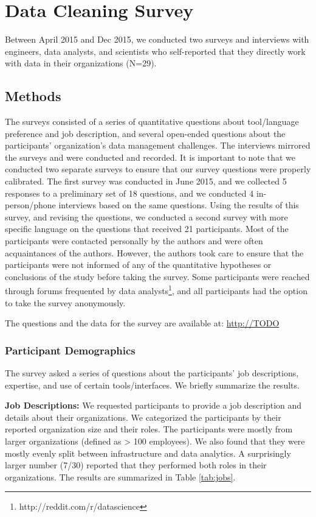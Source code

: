 \section{Data Cleaning Survey}
Between April 2015 and Dec 2015, we conducted two surveys and interviews with engineers, data analysts, and scientists who self-reported that they directly work with data in their organizations (N=29).

\subsection{Methods}
The surveys consisted of a series of quantitative questions about tool/language preference and job description, and several open-ended questions about the participants' organization's data management challenges. The interviews mirrored the surveys and were conducted and recorded. It is important to note that we conducted two separate surveys to ensure that our survey questions were properly calibrated. The first survey was conducted in June 2015, and we collected 5 responses to a preliminary set of 18 questions, and we conducted 4 in-person/phone interviews based on the same questions. Using the results of this survey, and revising the questions, we conducted a second survey with more specific language on the questions that received 21 participants. 
Most of the participants were contacted personally by the authors and were often acquaintances of the authors. However, the authors took care to ensure that the participants were not informed of any of the quantitative hypotheses or conclusions of the study before taking the survey. 
Some participants were reached through forums frequented by data analysts\footnote{http://reddit.com/r/datascience}, and all participants had the option to take the survey anonymously.

The questions and the data for the survey are available at: \url{http://TODO}

\subsubsection{Participant Demographics}
The survey asked a series of questions about the participants' job descriptions, expertise, and use of certain tools/interfaces.
We briefly summarize the results.

\vspace{0.5em}

\noindent\textbf{Job Descriptions: } We requested participants to provide a job description and details about their organizations. We categorized the participants by their reported organization size and their roles. The participants were mostly from larger organizations (defined as > 100 employees). We also found that they were mostly evenly split between infrastructure and data analytics. A surprisingly larger number (7/30) reported that they performed both roles in their organizations. The results are summarized in Table \ref{tab:jobs}. 

